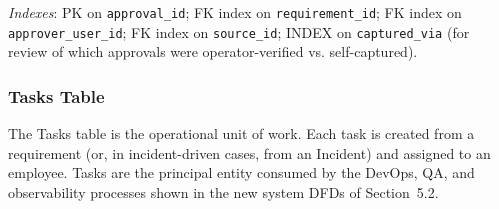 \documentclass[12pt,a4paper]{report}
\begin{document}
\noindent \emph{Indexes}: PK on \texttt{approval\_id}; FK index on
\texttt{requirement\_id}; FK index on \texttt{approver\_user\_id}; FK index on
\texttt{source\_id}; INDEX on \texttt{captured\_via} (for review of which
approvals were operator-verified vs. self-captured).

\subsubsection{Tasks Table}
\label{tab:tasks}

The Tasks table is the operational unit of work. Each task is created from a
requirement (or, in incident-driven cases, from an Incident) and assigned to an
employee. Tasks are the principal entity consumed by the DevOps, QA, and
observability processes shown in the new system DFDs of Section~5.2.
\end{document}
